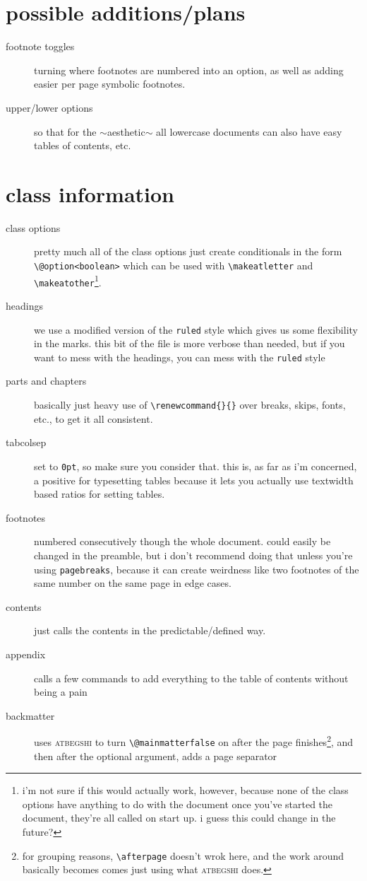 \documentclass[lowerhead,12pt]{aesthetic}
\begin{document}
\section{possible additions/plans}
\begin{description}
    \item[footnote toggles] turning where footnotes are numbered into an option, as well as adding easier per page symbolic footnotes.
    \item[upper/lower options] so that for the $\sim$aesthetic$\sim$ all lowercase documents can also have easy tables of contents, etc.
\end{description}

\section[class information]{class information\protect\footnotemark}\label{sec:aesinfo}
\begin{description}
    \item[class options] pretty much all of the class options just create conditionals in the form \verb|\@option<boolean>| which can be used with \verb|\makeatletter| and \verb|\makeatother|\footnote{i'm not sure if this would actually work, however, because none of the class options have anything to do with the document once you've started the document, they're all called on start up. i guess this could change in the future?}.
    \item[headings] we use a modified version of the \texttt{ruled} style which gives us some flexibility in the marks. this bit of the file is more verbose than needed, but if you want to mess with the headings, you can mess with the \texttt{ruled} style
    \item[parts and chapters] basically just heavy use of \verb|\renewcommand{}{}| over breaks, skips, fonts, etc., to get it all consistent.
    \item[tabcolsep] set to \texttt{0pt}, so make sure you consider that. this is, as far as i'm concerned, a positive for typesetting tables because it lets you actually use textwidth based ratios for setting tables.
    \item[footnotes] numbered consecutively though the whole document. could easily be changed in the preamble, but i don't recommend doing that unless you're using \texttt{pagebreaks}, because it can create weirdness like two footnotes of the same number on the same page in edge cases.
    \item[contents] just calls the contents in the predictable/defined way.
    \item[appendix] calls a few commands to add everything to the table of contents without being a pain
    \item[backmatter] uses {\scshape\ttfamily atbegshi} to turn \texttt{\textbackslash @mainmatterfalse} on after the page finishes\footnote{for grouping reasons, \texttt{\textbackslash afterpage} doesn't wrok here, and the work around basically becomes comes just using what {\scshape\ttfamily atbegshi} does.}, and then after the optional argument, adds a page separator
\end{description}
\end{document}
